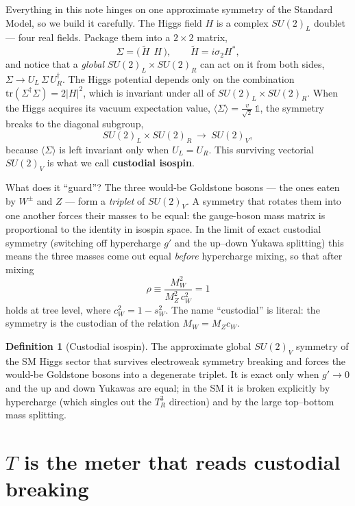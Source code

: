 \documentclass[11pt]{article}
\newcommand{\cw}{c_W}
\newcommand{\swsq}{s_W^2}
\newcommand{\cwsq}{c_W^2}
\newcommand{\vev}{v}
\newcommand{\SUL}{SU(2)_L}
\newcommand{\SUR}{SU(2)_R}
\newcommand{\rhoparam}{\rho}
\theoremstyle{definition}
\newtheorem{definition}{Definition}
\begin{document}
Everything in this note hinges on one approximate symmetry of the Standard
Model, so we build it carefully. The Higgs field $H$ is a complex $SU(2)_L$
doublet --- four real fields. Package them into a $2\times2$ matrix,
\begin{equation}
\Sigma = \big(\,\tilde H\ \ H\,\big), \qquad \tilde H = i\sigma_2 H^*,
\end{equation}
and notice that a \emph{global} $\SUL\times\SUR$ can act on it from both sides,
$\Sigma \to U_L\,\Sigma\,U_R^\dagger$. The Higgs potential depends only on the
combination $\mathrm{tr}(\Sigma^\dagger\Sigma) = 2|H|^2$, which is invariant
under all of $\SUL\times\SUR$. When the Higgs acquires its vacuum expectation
value, $\langle\Sigma\rangle = \tfrac{\vev}{\sqrt2}\,\mathbb{1}$, the symmetry
breaks to the diagonal subgroup,
\begin{equation}
\SUL\times\SUR \ \longrightarrow\ SU(2)_V,
\end{equation}
because $\langle\Sigma\rangle$ is left invariant only when $U_L = U_R$. This
surviving vectorial $SU(2)_V$ is what we call \textbf{custodial isospin}.

What does it ``guard''? The three would-be Goldstone bosons --- the ones eaten by
$W^\pm$ and $Z$ --- form a \emph{triplet} of $SU(2)_V$. A symmetry that rotates
them into one another forces their masses to be equal: the gauge-boson mass
matrix is proportional to the identity in isospin space. In the limit of exact
custodial symmetry (switching off hypercharge $g'$ and the up--down Yukawa
splitting) this means the three masses come out equal \emph{before} hypercharge
mixing, so that after mixing
\begin{equation}
\rhoparam \equiv \frac{M_W^2}{M_Z^2\,\cwsq} = 1
\label{eq:rho}
\end{equation}
holds at tree level, where $\cwsq = 1-\swsq$. The name ``custodial'' is literal:
the symmetry is the custodian of the relation $M_W = M_Z\cw$.

\begin{definition}[Custodial isospin]
The approximate global $SU(2)_V$ symmetry of the SM Higgs sector that survives
electroweak symmetry breaking and forces the would-be Goldstone bosons into a
degenerate triplet. It is exact only when $g'\to 0$ and the up and down Yukawas
are equal; in the SM it is broken explicitly by hypercharge (which singles out
the $T^3_R$ direction) and by the large top--bottom mass splitting.
\end{definition}

\section{$T$ is the meter that reads custodial breaking}
\label{sec:Tmeter}
\end{document}
